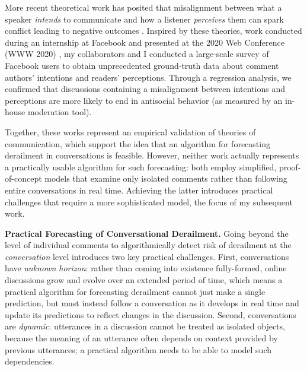 \documentclass[11pt,letterpaper]{article}
\renewcommand{\section}[1]{\vspace{0.25\baselineskip}\noindent\textbf{#1.}}
\begin{document}
More recent theoretical work has posited that misalignment between what a speaker \emph{intends} to communicate and how a listener \emph{perceives} them can spark conflict leading to negative outcomes \cite{tannen_indirectness_2000}.
Inspired by these theories, work conducted during an internship at Facebook and presented at the 2020 Web Conference (WWW 2020) \cite{chang_dont_2020}, my collaborators and I conducted a large-scale survey of Facebook users to obtain unprecedented ground-truth data about comment authors' intentions and readers' perceptions.
Through a regression analysis, we confirmed that discussions containing a misalignment between intentions and perceptions are more likely to end in antisocial behavior (as measured by an in-house moderation tool).

Together, these works represent an empirical validation of theories of communication, which support the idea that an algorithm for forecasting derailment in conversations is feasible.
However, neither work actually represents a practically usable algorithm for such forecasting: both employ simplified, proof-of-concept models that examine only isolated comments rather than following entire conversations in real time.
Achieving the latter introduces practical challenges that require a more sophisticated model, the focus of my subsequent work.

\section{Practical Forecasting of Conversational Derailment}
Going beyond the level of individual comments to algorithmically detect risk of derailment at the \emph{conversation} level introduces two key practical challenges.
First, conversations have \emph{unknown horizon}: rather than coming into existence fully-formed, online discussions grow and evolve over an extended period of time, which means a practical algorithm for forecasting derailment cannot just make a single prediction, but must instead follow a conversation as it develops in real time and update its predictions to reflect changes in the discussion.
Second, conversations are \emph{dynamic}: utterances in a discussion cannot be treated as isolated objects, because the meaning of an utterance often depends on context provided by previous utterances; a practical algorithm needs to be able to model such dependencies.
\end{document}
